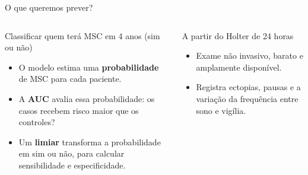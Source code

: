 \documentclass[10pt,aspectratio=169]{beamer}
\begin{document}
\begin{frame}{O que queremos prever?}
  \begin{columns}[c]
    \small
    \begin{block}{Classificar quem terá MSC em 4 anos (sim ou não)}
      \begin{itemize}
        \item O modelo estima uma \textbf{probabilidade} de MSC para cada
          paciente.
        \item A \textbf{AUC} avalia essa probabilidade: os casos recebem
          risco maior que os controles?
        \item Um \textbf{limiar} transforma a probabilidade em sim ou não,
          para calcular sensibilidade e especificidade.
      \end{itemize}
    \end{block}
    \begin{block}{A partir do Holter de 24 horas}
      \begin{itemize}
        \item Exame não invasivo, barato e amplamente disponível.
        \item Registra ectopias, pausas e a variação da frequência entre sono
          e vigília.
      \end{itemize}
    \end{block}
    \centering
  \end{columns}
\end{frame}
\end{document}
